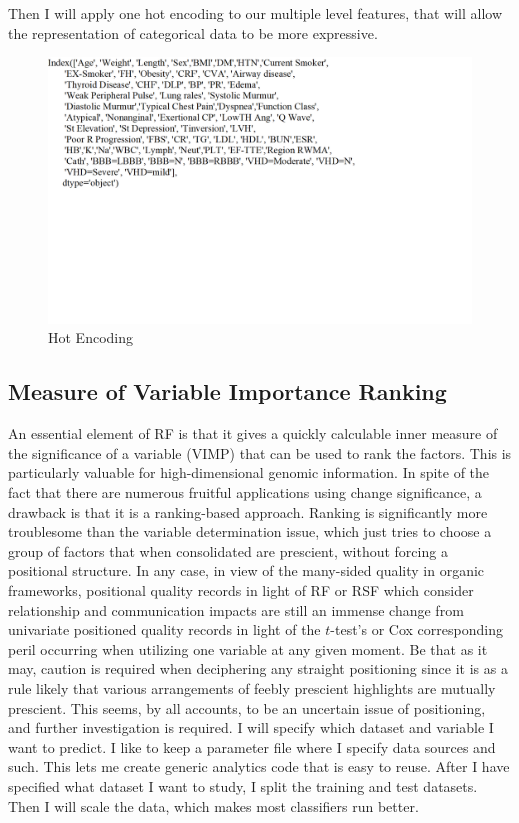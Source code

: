 Then I will apply one hot encoding to our multiple level features,
that will allow the representation of categorical data to be more
expressive.

\begin{figure}
    \centering
    \includegraphics[width=1.0\columnwidth]{images/Encoding.png}
    \caption{Hot Encoding}\label{Hot Enco}
\end{figure}
    
\subsection{Measure of Variable Importance Ranking}

An essential element of RF is that it gives a quickly calculable inner
measure of the significance of a variable (VIMP) that can be used to
rank the factors. This is particularly valuable for high-dimensional
genomic information. In spite of the fact that there are numerous
fruitful applications using change significance, a drawback is that it
is a ranking-based approach. Ranking is significantly more troublesome
than the variable determination issue, which just tries to choose a
group of factors that when consolidated are prescient, without forcing
a positional structure. In any case, in view of the many-sided quality
in organic frameworks, positional quality records in light of RF or
RSF which consider relationship and communication impacts are still an
immense change from univariate positioned quality records in light of
the $t$-test's or Cox corresponding peril occurring when utilizing one
variable at any given moment. Be that as it may, caution is required
when deciphering any straight positioning since it is as a rule likely
that various arrangements of feebly prescient highlights are mutually
prescient. This seems, by all accounts, to be an uncertain issue of
positioning, and further investigation is required. I will specify
which dataset and variable I want to predict. I like to keep a
parameter file where I specify data sources and such. This lets me
create generic analytics code that is easy to reuse. After I have
specified what dataset I want to study, I split the training and test
datasets. Then I will scale the data, which makes most classifiers run
better.

